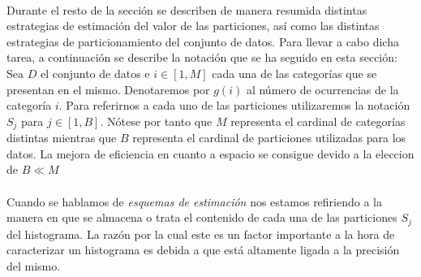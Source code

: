 \documentclass{subfiles}
\begin{document}
        \paragraph{}
        Durante el resto de la sección se describen de manera resumida distintas estrategias de estimación del valor de las particiones, así como las distintas estrategias de particionamiento del conjunto de datos. Para llevar a cabo dicha tarea, a continuación se describe la notación que se ha seguido en esta sección: Sea $D$ el conjunto de datos e $i \in [1,M]$ cada una de las categorías que se presentan en el mismo. Denotaremos por $g(i)$ al número de ocurrencias de la categoría $i$. Para referirnos a cada uno de las particiones utilizaremos la notación $S_j$ para $j \in [1, B]$. Nótese por tanto que $M$ representa el cardinal de categorías distintas mientras que $B$ representa el cardinal de particiones utilizadas para  los datos. La mejora de eficiencia en cuanto a espacio se consigue devido a la eleccion de $B \ll M$

        \paragraph{}
        Cuando se hablamos de \emph{esquemas de estimación} nos estamos refiriendo a la manera en que se almacena o trata el contenido de cada una de las particiones $S_j$ del histograma. La razón por la cual este es un factor importante a la hora de caracterizar un histograma es debida a que está altamente ligada a la precisión del mismo.
\end{document}
